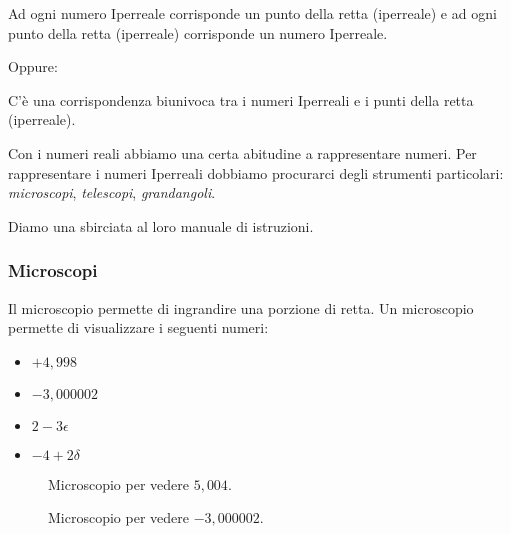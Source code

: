 \begin{postulato}
Ad ogni numero Iperreale corrisponde un punto della retta (iperreale) e ad ogni 
punto della retta (iperreale) corrisponde un numero Iperreale.
\end{postulato}

Oppure:

\begin{postulato}
C'è una corrispondenza biunivoca tra i numeri Iperreali e 
i punti della retta (iperreale).
\end{postulato}

Con i numeri reali abbiamo una certa abitudine a rappresentare numeri.
Per rappresentare i numeri Iperreali dobbiamo procurarci degli strumenti 
particolari: \emph{microscopi}, \emph{telescopi}, \emph{grandangoli}.

Diamo una sbirciata al loro manuale di istruzioni.

\subsubsection{Microscopi}
\label{subsec:insnum_microscopio}

Il microscopio permette di ingrandire una porzione di retta. 
Un microscopio permette di visualizzare i seguenti numeri:

\begin{multicols}{4}
\begin{itemize}[nosep]
 \item $+4,998$
 \item $-3,000002$
 \item $2-3\epsilon$
 \item $-4+2\delta$
\end{itemize}
\end{multicols}

\begin{figure}[h]
\begin{inaccessibleblock}

\begin{minipage}{.48\linewidth}
 \begin{center}
\microscopioa
 \end{center}
\caption{Microscopio per vedere \(5,004\).} \label{fig:microscopioa}
\end{minipage}
\hfill
\begin{minipage}{.48\linewidth}
 \begin{center}
\microscopiob
 \end{center}
\caption{Microscopio per vedere \(-3,000002\).} \label{fig:microscopiob}
\end{minipage}

\end{inaccessibleblock}
\end{figure}
 
